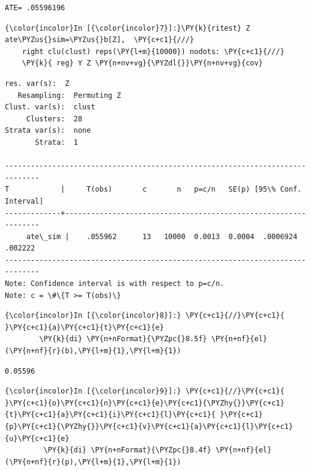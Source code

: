\documentclass[11pt,notitlepage]{article}\usepackage[]{graphicx}\usepackage[]{color}
\makeatletter
\newenvironment{kframe}{%
 \def\at@end@of@kframe{}%
 \ifinner\ifhmode%
  \def\at@end@of@kframe{\end{minipage}}%
  \begin{minipage}{\columnwidth}%
 \fi\fi%
 \def\FrameCommand##1{\hskip\@totalleftmargin \hskip-\fboxsep
 \colorbox{shadecolor}{##1}\hskip-\fboxsep
     \hskip-\linewidth \hskip-\@totalleftmargin \hskip\columnwidth}%
 \MakeFramed {\advance\hsize-\width
   \@totalleftmargin\z@ \linewidth\hsize
   \@setminipage}}%
 {\par\unskip\endMakeFramed%
 \at@end@of@kframe}
\newenvironment{knitrout}{}{} %
\makeatother
\begin{document}
\begin{enumerate}[a)]
\begin{knitrout}
\begin{kframe}
    \begin{Verbatim}[commandchars=\\\{\}]
ATE= .05596196
    \end{Verbatim}

    \begin{Verbatim}[commandchars=\\\{\}]
{\color{incolor}In [{\color{incolor}7}]:}\PY{k}{ritest} Z ate\PYZus{}sim=\PYZus{}b[Z],  \PY{c+c1}{///}
	right clu(clust) reps(\PY{l+m}{10000}) nodots: \PY{c+c1}{///}
	\PY{k}{ reg} Y Z \PY{n+nv+vg}{\PYZdl{}}\PY{n+nv+vg}{cov}
\end{Verbatim}

    \begin{Verbatim}[commandchars=\\\{\}]
  res. var(s):  Z
   Resampling:  Permuting Z
Clust. var(s):  clust
     Clusters:  28
Strata var(s):  none
       Strata:  1

------------------------------------------------------------------------------
T            |     T(obs)       c       n   p=c/n   SE(p) [95\% Conf. Interval]
-------------+----------------------------------------------------------------
     ate\_sim |    .055962      13   10000  0.0013  0.0004  .0006924    .002222
------------------------------------------------------------------------------
Note: Confidence interval is with respect to p=c/n.
Note: c = \#\{T >= T(obs)\}

    \end{Verbatim}

    \begin{Verbatim}[commandchars=\\\{\}]
{\color{incolor}In [{\color{incolor}8}]:} \PY{c+c1}{//}\PY{c+c1}{ }\PY{c+c1}{a}\PY{c+c1}{t}\PY{c+c1}{e}
        \PY{k}{di} \PY{n+nFormat}{\PYZpc{}8.5f} \PY{n+nf}{el}(\PY{n+nf}{r}(b),\PY{l+m}{1},\PY{l+m}{1})
\end{Verbatim}

    \begin{Verbatim}[commandchars=\\\{\}]
 0.05596
    \end{Verbatim}

    \begin{Verbatim}[commandchars=\\\{\}]
{\color{incolor}In [{\color{incolor}9}]:} \PY{c+c1}{//}\PY{c+c1}{ }\PY{c+c1}{o}\PY{c+c1}{n}\PY{c+c1}{e}\PY{c+c1}{\PYZhy{}}\PY{c+c1}{t}\PY{c+c1}{a}\PY{c+c1}{i}\PY{c+c1}{l}\PY{c+c1}{ }\PY{c+c1}{p}\PY{c+c1}{\PYZhy{}}\PY{c+c1}{v}\PY{c+c1}{a}\PY{c+c1}{l}\PY{c+c1}{u}\PY{c+c1}{e}
         \PY{k}{di} \PY{n+nFormat}{\PYZpc{}8.4f} \PY{n+nf}{el}(\PY{n+nf}{r}(p),\PY{l+m}{1},\PY{l+m}{1})
\end{Verbatim}


\end{kframe}
\end{knitrout}
\end{enumerate}
\end{document}
